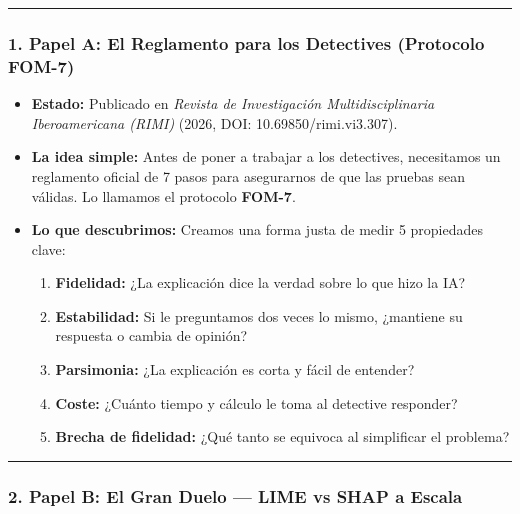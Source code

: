 \documentclass[
]{article}
\providecommand{\tightlist}{%
  \setlength{\itemsep}{0pt}\setlength{\parskip}{0pt}}
\begin{document}
\begin{center}\rule{0.5\linewidth}{0.5pt}\end{center}

\subsubsection{1. Papel A: El Reglamento para los Detectives (Protocolo
FOM-7)}\label{papel-a-el-reglamento-para-los-detectives-protocolo-fom-7}

\begin{itemize}
\tightlist
\item
  \textbf{Estado:} Publicado en \emph{Revista de Investigación
  Multidisciplinaria Iberoamericana (RIMI)} (2026, DOI:
  10.69850/rimi.vi3.307).
\item
  \textbf{La idea simple:} Antes de poner a trabajar a los detectives,
  necesitamos un reglamento oficial de 7 pasos para asegurarnos de que
  las pruebas sean válidas. Lo llamamos el protocolo \textbf{FOM-7}.
\item
  \textbf{Lo que descubrimos:} Creamos una forma justa de medir 5
  propiedades clave:

  \begin{enumerate}
  \def\labelenumi{\arabic{enumi}.}
  \tightlist
  \item
    \textbf{Fidelidad:} ¿La explicación dice la verdad sobre lo que hizo
    la IA?
  \item
    \textbf{Estabilidad:} Si le preguntamos dos veces lo mismo,
    ¿mantiene su respuesta o cambia de opinión?
  \item
    \textbf{Parsimonia:} ¿La explicación es corta y fácil de entender?
  \item
    \textbf{Coste:} ¿Cuánto tiempo y cálculo le toma al detective
    responder?
  \item
    \textbf{Brecha de fidelidad:} ¿Qué tanto se equivoca al simplificar
    el problema?
  \end{enumerate}
\end{itemize}

\begin{center}\rule{0.5\linewidth}{0.5pt}\end{center}

\subsubsection{2. Papel B: El Gran Duelo --- LIME vs SHAP a
Escala}\label{papel-b-el-gran-duelo-lime-vs-shap-a-escala}
\end{document}
